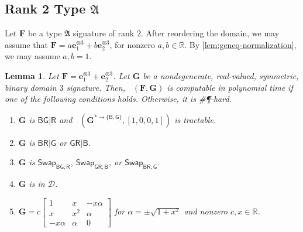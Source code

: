 \documentclass[11pt]{article}
\newtheorem{lemma}[theorem]{Lemma}
\DeclareMathOperator{\holbs}{Holant^*_2}
\DeclareMathOperator{\holts}{Holant^*_3}
\newcommand{\db}{\mathsf{B}}
\newcommand{\dg}{\mathsf{G}}
\newcommand{\dr}{\mathsf{R}}
\newcommand{\swhelper}[1]{$\mathsf{Swap}_{#1}$\xspace}
\newcommand{\swbg}{\swhelper{\db \dg; \dr}}
\newcommand{\swbr}{\swhelper{\db \dr; \dg}}
\newcommand{\swgr}{\swhelper{\dg \dr; \db}}
\newcommand{\sph}{\#\P-hard\xspace}
\newcommand{\teh}{^{\otimes 3}}
\newcommand{\domres}[1]{
  ^{*\to\{#1\}}
}
\newcommand{\bdgr}{\dg \dr | \db}
\newcommand{\ternarytractgeneq}{$\mathfrak{A}$\xspace}
\begin{document}
\subsection{Rank 2 Type \texorpdfstring{\ternarytractgeneq}{A}}
Let $\mathbf{F}$ be a type \ternarytractgeneq signature of rank $2$.
After reordering the domain, we may assume that $\mathbf{F} = a \mathbf{e}_1 \teh + b \mathbf{e}_2 \teh$, for nonzero $a, b \in \mathbb{R}$.
By \cref{lem:geneq-normalization}, we may assume $a, b = 1$.

\begin{lemma}\label{lem:dichotomy-single-ternary-rank-2-geneq-single-binary}
  Let $\mathbf{F} = \mathbf{e}_1 \teh + \mathbf{e}_2 \teh$.
  Let $\mathbf{G}$ be a nondegenerate, real-valued, symmetric, binary domain $3$ signature.
  Then, $\holts(\mathbf{F}, \mathbf{G})$ is computable in polynomial time if one of the following conditions holds. Otherwise, it is \sph.
  \begin{enumerate}
    \item $\mathbf{G}$ is $\db \dg | \dr$ and $\holbs(\mathbf{G}\domres{\db, \dg}, [1, 0, 0, 1])$ is tractable.
    \item $\mathbf{G}$ is $\db \dr | \dg$ or $\bdgr$.
    \item $\mathbf{G}$ is \swbg, \swgr, or \swbr.
    \item $\mathbf{G}$ is in $\mathcal{D}$.
    \item $\mathbf{G} = c \begin{bmatrix}
        1 & x & -x \alpha \\
        x & x^2 & \alpha \\
        -x \alpha & \alpha & 0
      \end{bmatrix}$ for $\alpha = \pm \sqrt{1 + x^2}$ and nonzero $c, x \in \mathbb{R}$.
  \end{enumerate}
\end{lemma}
\end{document}
